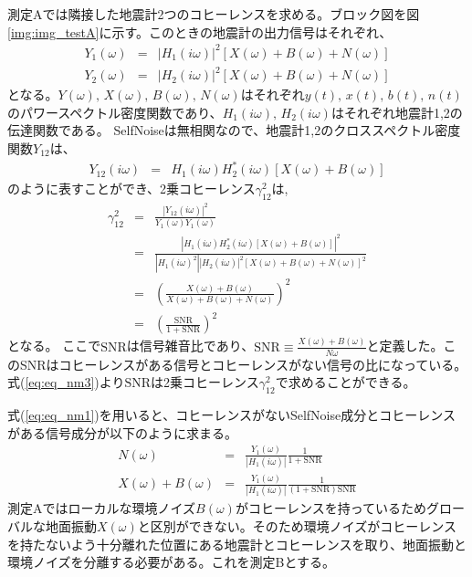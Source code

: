 測定Aでは隣接した地震計2つのコヒーレンスを求める。ブロック図を図\ref{img:img_testA}に示す。このときの地震計の出力信号はそれぞれ、
\begin{eqnarray}
  Y_{1}(\omega) &=& \left| H_{1}(i\omega)\right|^{2}\left[X(\omega)+B(\omega)+N(\omega) \right] \label{eq:eq_nm1} \\ 
  Y_{2}(\omega) &=& \left| H_{2}(i\omega)\right|^{2}\left[X(\omega)+B(\omega)+N(\omega) \right] \label{eq:eq_nm2}
\end{eqnarray}
となる。$Y(\omega),\,X(\omega),\,B(\omega),\,N(\omega)$はそれぞれ$y(t),\,x(t),\,b(t),\,n(t)$のパワースペクトル密度関数であり、$H_1(i\omega),\,H_2(i\omega)$はそれぞれ地震計1,2の伝達関数である。
SelfNoiseは無相関なので、地震計1,2のクロススペクトル密度関数$Y_{12}$は、
\begin{eqnarray}
Y_{12}(i\omega) &=& H_{1}(i\omega)H_{2}^{*}(i\omega)\left[X(\omega)+B(\omega) \right] 
\end{eqnarray}
のように表すことができ、2乗コヒーレンス$\gamma_{12}^{2}$は,
\begin{eqnarray}
  \gamma_{12}^{2} &=& \frac{\left| Y_{12}(i\omega)\right|^{2}}{Y_1(\omega)Y_1({\omega})}\\
  &=& \frac{\left | H_{1}(i\omega)H_{2}^{*}(i\omega)\left[X(\omega)+B(\omega) \right] \right |^{2}}{\left| H_{1}(i\omega)^{2}\right|\left|H_{2}(i\omega)\right|^{2}\left[X(\omega)+B(\omega)+N(\omega) \right]^{2}}\\
  &=& \left( \frac{X(\omega)+B(\omega)}{X(\omega)+B(\omega)+N(\omega)} \right)^{2}\\
    &=& \left( \frac{\mathrm{SNR}}{1+\mathrm{SNR}} \right)^{2}\label{eq:eq_nm3}
\end{eqnarray}
となる。
ここで$\mathrm{SNR}$は信号雑音比であり、$\mathrm{SNR}\equiv \frac{X(\omega)+B(\omega)}{N{\omega}}$と定義した。このSNRはコヒーレンスがある信号とコヒーレンスがない信号の比になっている。式(\ref{eq:eq_nm3})より$\mathrm{SNR}$は2乗コヒーレンス$\gamma^{2}_{12}$で求めることができる。

式(\ref{eq:eq_nm1})を用いると、コヒーレンスがないSelfNoise成分とコヒーレンスがある信号成分が以下のように求まる。
\begin{eqnarray}
  N(\omega) &=& \frac{Y_{1}(\omega)}{\left| H_{1}(i\omega) \right|}\frac{1}{1+\mathrm{SNR}} \label{eq:eq_nm4}\\
  X(\omega) + B(\omega) &=& \frac{Y_{1}(\omega)}{\left| H_{1}(i\omega) \right|}\frac{1}{(1+\mathrm{SNR})\mathrm{SNR}} \label{eq:eq_nm5}
\end{eqnarray}
測定Aではローカルな環境ノイズ$B(\omega)$がコヒーレンスを持っているためグローバルな地面振動$X({\omega})$と区別ができない。そのため環境ノイズがコヒーレンスを持たないよう十分離れた位置にある地震計とコヒーレンスを取り、地面振動と環境ノイズを分離する必要がある。これを測定Bとする。


